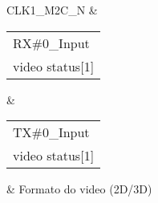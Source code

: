 \begin{longtable}[h!]
	CLK1\_M2C\_N & \begin{tabular}[l]{@{}l@{}}RX\#0\_Input \\ video status{[}1{]}\end{tabular}    & \begin{tabular}[l]{@{}l@{}}TX\#0\_Input \\ video status{[}1{]}\end{tabular}       & Formato do video (2D/3D)   \\ 

\end{longtable}
